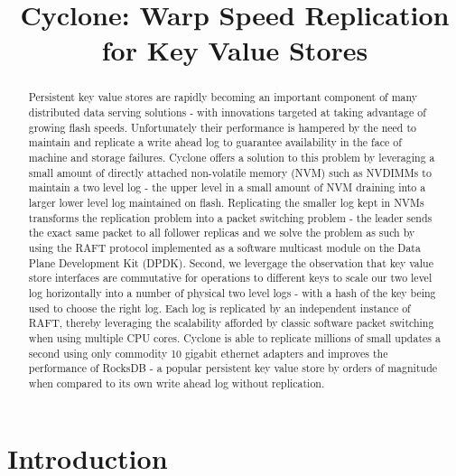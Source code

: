 \documentclass[10pt, preprint, nonatbib]{sigplanconf}
\date{}
\begin{document}
\title{\Large \bf Cyclone: Warp Speed Replication for Key Value Stores}

\maketitle


\begin{abstract}
Persistent key value stores are rapidly becoming an important component of many
distributed data serving solutions - with innovations targeted at taking
advantage of growing flash speeds. Unfortunately their performance is hampered
by the need to maintain and replicate a write ahead log to guarantee
availability in the face of machine and storage failures. Cyclone offers a
solution to this problem by leveraging a small amount of directly attached
non-volatile memory (NVM) such as NVDIMMs to maintain a two level log - the upper
level in a small amount of NVM draining into a larger lower level log
maintained on flash. Replicating the smaller log kept in NVMs transforms the
replication problem into a packet switching problem - the leader sends the exact
same packet to all follower replicas and we solve the problem as such by using
the RAFT protocol implemented as a software multicast module on the Data Plane
Development Kit (DPDK). Second, we levergage the observation that key value store
interfaces are commutative for operations to different keys to scale our two
level log horizontally into a number of physical two level logs - with a hash of
the key being used to choose the right log. Each log is replicated by an
independent instance of RAFT, thereby leveraging the scalability afforded by
classic software packet switching when using multiple CPU cores. Cyclone is able
to replicate millions of small updates a second using only commodity 10 gigabit
ethernet adapters and improves the performance of RocksDB - a popular persistent
key value store by orders of magnitude when compared to its own write ahead log
without replication.
\end{abstract}

\section{Introduction}
\end{document}
